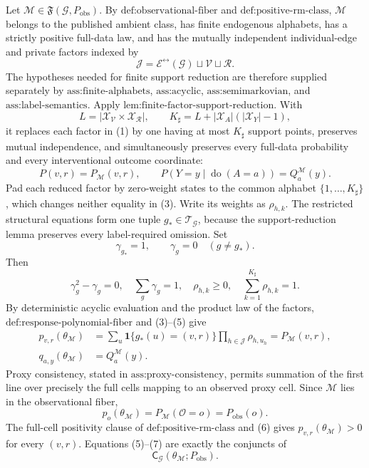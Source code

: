 Let \(\mathcal M\in\mathfrak F(\mathcal G,P_{\mathrm{obs}})\). By \(\text{def:observational-fiber}\) and \(\text{def:positive-rm-class}\), \(\mathcal M\) belongs to the published ambient class, has finite endogenous alphabets, has a strictly positive full-data law, and has the mutually independent individual-edge and private factors indexed by
\[
\mathcal J=\mathcal E^{\leftrightarrow}(\mathcal G)\sqcup\mathcal V\sqcup\mathcal R.
\tag{1}
\]
The hypotheses needed for finite support reduction are therefore supplied separately by \(\text{ass:finite-alphabets}\), \(\text{ass:acyclic}\), \(\text{ass:semimarkovian}\), and \(\text{ass:label-semantics}\). Apply \(\text{lem:finite-factor-support-reduction}\). With
\[
L=|\mathcal X_{\mathcal V}\times\mathcal X_{\mathcal R}|,
\qquad
K_{\sharp}=L+|\mathcal X_A|(|\mathcal X_Y|-1),
\tag{2}
\]
it replaces each factor in (1) by one having at most \(K_{\sharp}\) support points, preserves mutual independence, and simultaneously preserves every full-data probability and every interventional outcome coordinate:
\[
P(v,r)=P_{\mathcal M}(v,r),
\qquad
P(Y=y\mid\operatorname{do}(A=a))=Q_a^{\mathcal M}(y).
\tag{3}
\]
Pad each reduced factor by zero-weight states to the common alphabet \(\{1,\ldots,K_{\sharp}\}\), which changes neither equality in (3). Write its weights as \(\rho_{h,k}\). The restricted structural equations form one tuple \(g_*\in\mathcal T_{\mathcal G}\), because the support-reduction lemma preserves every label-required omission. Set
\[
\gamma_{g_*}=1,
\qquad
\gamma_g=0\quad(g\neq g_*).
\tag{4}
\]
Then
\[
\gamma_g^2-\gamma_g=0,
\quad
\sum_g\gamma_g=1,
\quad
\rho_{h,k}\geq0,
\quad
\sum_{k=1}^{K_{\sharp}}\rho_{h,k}=1.
\tag{5}
\]
By deterministic acyclic evaluation and the product law of the factors, \(\text{def:response-polynomial-fiber}\) and (3)--(5) give
\[
\begin{aligned}
p_{v,r}(\theta_{\mathcal M})
&=\sum_{u}\mathbf 1\{g_*(u)=(v,r)\}
\prod_{h\in\mathcal J}\rho_{h,u_h}
=P_{\mathcal M}(v,r),\\
q_{a,y}(\theta_{\mathcal M})
&=Q_a^{\mathcal M}(y).
\end{aligned}
\tag{6}
\]
Proxy consistency, stated in \(\text{ass:proxy-consistency}\), permits summation of the first line over precisely the full cells mapping to an observed proxy cell. Since \(\mathcal M\) lies in the observational fiber,
\[
p_o(\theta_{\mathcal M})
=P_{\mathcal M}(\mathcal O=o)
=P_{\mathrm{obs}}(o).
\tag{7}
\]
The full-cell positivity clause of \(\text{def:positive-rm-class}\) and (6) gives \(p_{v,r}(\theta_{\mathcal M})>0\) for every \((v,r)\). Equations (5)--(7) are exactly the conjuncts of
\[
\mathsf C_{\mathcal G}(\theta_{\mathcal M};P_{\mathrm{obs}}).
\tag{8}
\]

